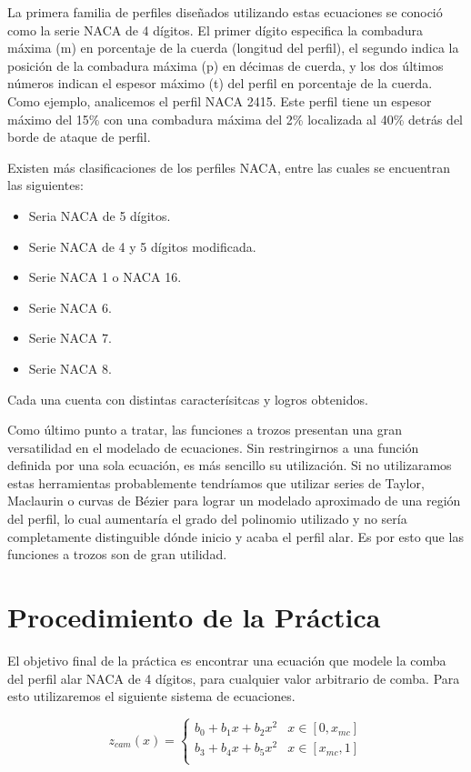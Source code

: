 \documentclass[12pt, letterpaper]{article}
\begin{document}
La primera familia de perfiles diseñados utilizando estas ecuaciones se conoció como la serie NACA de 4 dígitos. El primer dígito especifica la combadura máxima (m) en porcentaje de la cuerda (longitud del perfil), el segundo indica la posición de la combadura máxima (p) en décimas de cuerda, y los dos últimos números indican el espesor máximo (t) del perfil en porcentaje de la cuerda. Como ejemplo, analicemos el perfil NACA 2415. Este perfil tiene un espesor máximo del 15\% con una combadura máxima del 2\% localizada al 40\% detrás del borde de ataque de perfil.

Existen más clasificaciones de los perfiles NACA, entre las cuales se encuentran las siguientes:

\begin{itemize}
	\item Seria NACA de 5 dígitos.
	\item Serie NACA de 4 y 5 dígitos modificada.
	\item Serie NACA 1 o NACA 16.
	\item Serie NACA 6.
	\item Serie NACA 7.
	\item Serie NACA 8.
\end{itemize}

\noindent Cada una cuenta con distintas caracterísitcas y logros obtenidos.

Como último punto a tratar, las funciones a trozos presentan una gran versatilidad en el modelado de ecuaciones. Sin restringirnos a una función definida por una sola ecuación, es más sencillo su utilización. Si no utilizaramos estas herramientas probablemente tendríamos que utilizar series de Taylor,  Maclaurin o curvas de Bézier para lograr un modelado aproximado de una región del perfil, lo cual aumentaría el grado del polinomio utilizado y no sería completamente distinguible dónde inicio y acaba el perfil alar. Es por esto que las funciones a trozos son de gran utilidad.

\section*{Procedimiento de la Práctica}
El objetivo final de la práctica es encontrar una ecuación que modele la comba del perfil alar NACA de 4 dígitos, para cualquier valor arbitrario de comba. Para esto utilizaremos el siguiente sistema de ecuaciones.

\begin{equation}
	z_{cam}(x) = 
	\left\{
	\begin{array}{ll}
		b_0 + b_1 x + b_2 x^2 & x \in [0, x_{mc}] \\
		b_3 + b_4 x+ b_5 x^2 & x \in [x_{mc}, 1] \\
	\end{array}
	\right.
\end{equation}
\end{document}
